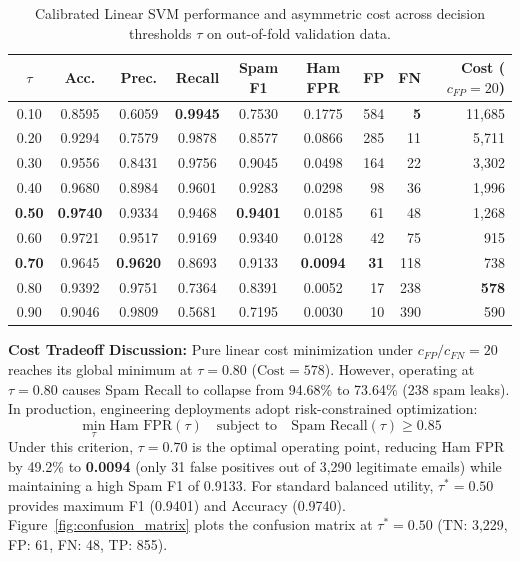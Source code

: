 \documentclass[9.5pt,twocolumn,letterpaper]{article}
\begin{document}
\begin{table}[htbp]
\centering
\scriptsize
\setlength{\tabcolsep}{2.5pt}
\renewcommand{\arraystretch}{1.08}
\begin{tabularx}{\columnwidth}{c c c c c c r r r}
\toprule
\textbf{$\tau$} & \textbf{Acc.} & \textbf{Prec.} & \textbf{Recall} & \textbf{Spam F1} & \textbf{Ham FPR} & \textbf{FP} & \textbf{FN} & \textbf{Cost ($c_{FP}=20$)} \\
\midrule
0.10 & 0.8595 & 0.6059 & \textbf{0.9945} & 0.7530 & 0.1775 & 584 & \textbf{5} & 11,685 \\
0.20 & 0.9294 & 0.7579 & 0.9878 & 0.8577 & 0.0866 & 285 & 11 & 5,711 \\
0.30 & 0.9556 & 0.8431 & 0.9756 & 0.9045 & 0.0498 & 164 & 22 & 3,302 \\
0.40 & 0.9680 & 0.8984 & 0.9601 & 0.9283 & 0.0298 & 98 & 36 & 1,996 \\
\textbf{0.50} & \textbf{0.9740} & 0.9334 & 0.9468 & \textbf{0.9401} & 0.0185 & 61 & 48 & 1,268 \\
0.60 & 0.9721 & 0.9517 & 0.9169 & 0.9340 & 0.0128 & 42 & 75 & 915 \\
\textbf{0.70} & 0.9645 & \textbf{0.9620} & 0.8693 & 0.9133 & \textbf{0.0094} & \textbf{31} & 118 & 738 \\
0.80 & 0.9392 & 0.9751 & 0.7364 & 0.8391 & 0.0052 & 17 & 238 & \textbf{578} \\
0.90 & 0.9046 & 0.9809 & 0.5681 & 0.7195 & 0.0030 & 10 & 390 & 590 \\
\bottomrule
\end{tabularx}
\caption{Calibrated Linear SVM performance and asymmetric cost across decision thresholds $\tau$ on out-of-fold validation data.}
\label{tab:threshold_tradeoffs}
\end{table}

\textbf{Cost Tradeoff Discussion:} Pure linear cost minimization under $c_{FP}/c_{FN}=20$ reaches its global minimum at $\tau=0.80$ ($\text{Cost}=578$). However, operating at $\tau=0.80$ causes Spam Recall to collapse from 94.68\% to 73.64\% (238 spam leaks). In production, engineering deployments adopt risk-constrained optimization:
\begin{equation}
\min_{\tau} \text{Ham FPR}(\tau) \quad \text{subject to} \quad \text{Spam Recall}(\tau) \ge 0.85
\end{equation}
Under this criterion, $\tau=0.70$ is the optimal operating point, reducing Ham FPR by 49.2\% to \textbf{0.0094} (only 31 false positives out of 3,290 legitimate emails) while maintaining a high Spam F1 of 0.9133. For standard balanced utility, $\tau^*=0.50$ provides maximum F1 (0.9401) and Accuracy (0.9740). Figure~\ref{fig:confusion_matrix} plots the confusion matrix at $\tau^*=0.50$ (TN: 3,229, FP: 61, FN: 48, TP: 855).
\end{document}

